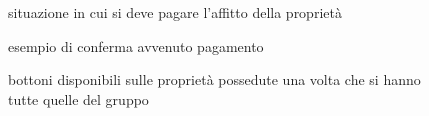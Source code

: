 \begin{figure}[H]
    \centering
    \caption{situazione in cui si deve pagare l'affitto della proprietà}
	\label{img:gamescreen9}
\end{figure}
\begin{figure}[H]
    \centering
    \caption{esempio di conferma avvenuto pagamento}
	\label{img:gamescreen10}
\end{figure}
\begin{figure}[H]
    \centering
    \caption{bottoni disponibili sulle proprietà possedute una volta che si hanno tutte quelle del gruppo}
	\label{img:gamescreen11}
\end{figure}
